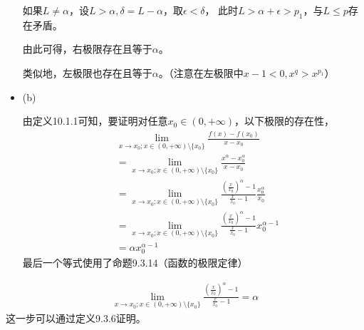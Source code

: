 \documentclass{article}
\begin{document}
\begin{itemize}
        如果$L \neq \alpha$，设$L > \alpha, \delta = L - \alpha$，取$\epsilon < \delta $，
        此时$L > \alpha + \epsilon > p_1$，与$L \leq p$存在矛盾。

        由此可得，右极限存在且等于$\alpha$。

        类似地，左极限也存在且等于$\alpha$。（注意在左极限中$x - 1 < 0, x^{q} > x^{p_1}$）

  \item (b)

        由定义10.1.1可知，要证明对任意$x_0 \in (0, +\infty)$，以下极限的存在性，
        \begin{align*}
           & \lim \limits_{x \to x_0; x \in (0, +\infty) \setminus \{x_0\}} \frac{f(x) - f(x_0)}{x - x_0}                                                    \\
           & = \lim \limits_{x \to x_0; x \in (0, +\infty) \setminus \{x_0\}} \frac{x^{\alpha} - x_0^{\alpha}}{x - x_0}                                      \\
           & = \lim \limits_{x \to x_0; x \in (0, +\infty) \setminus \{x_0\}} \frac{(\frac{x}{x_0})^{\alpha} - 1}{\frac{x}{x_0} - 1}\frac{x_0^{\alpha}}{x_0} \\
           & = \lim \limits_{x \to x_0; x \in (0, +\infty) \setminus \{x_0\}} \frac{(\frac{x}{x_0})^{\alpha} - 1}{\frac{x}{x_0} - 1}x_0^{\alpha - 1}         \\
           & = \alpha x_0^{\alpha - 1}
        \end{align*}
        最后一个等式使用了命题9.3.14（函数的极限定律）

\end{itemize}

\begin{zremark}
  \begin{align*}
    \lim \limits_{x \to x_0; x \in (0, +\infty) \setminus \{x_0\}} \frac{(\frac{x}{x_0})^{\alpha} - 1}{\frac{x}{x_0} - 1} = \alpha
  \end{align*}
  这一步可以通过定义9.3.6证明。
\end{zremark}
\end{document}
